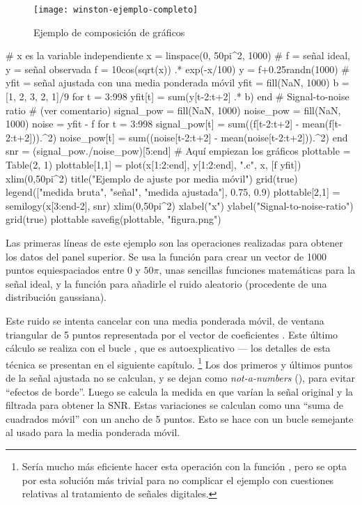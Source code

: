 \begin{figure}
\centering
\texttt{[image: winston-ejemplo-completo]}
\caption{Ejemplo de composición de gráficos}
\label{fig:winston-ejemplo-completo}
\end{figure}

\begin{juliacode}
# x es la variable independiente
x = linspace(0, 50pi^2, 1000)
# f = señal ideal, y = señal observada
f = 10cos(sqrt(x)) .* exp(-x/100)
y = f+0.25randn(1000)
# yfit = señal ajustada con una media ponderada móvil
yfit = fill(NaN, 1000)
b = [1, 2, 3, 2, 1]/9
for t = 3:998
  yfit[t] = sum(y[t-2:t+2] .* b)
end
# Signal-to-noise ratio
# (ver comentario)
signal_pow = fill(NaN, 1000)
noise_pow = fill(NaN, 1000)
noise = yfit - f
for t = 3:998
  signal_pow[t] = sum((f[t-2:t+2] - mean(f[t-2:t+2])).^2)
  noise_pow[t] = sum((noise[t-2:t+2] - mean(noise[t-2:t+2])).^2)
end
snr = (signal_pow./noise_pow)[5:end]
# Aquí empiezan los gráficos
plottable = Table(2, 1)
plottable[1,1] = plot(x[1:2:end], y[1:2:end], ".c", x, [f yfit])
xlim(0,50pi^2)
title("Ejemplo de ajuste por media móvil")
grid(true)
legend(["medida bruta", "señal", "medida ajustada"], 0.75, 0.9)
plottable[2,1] = semilogy(x[3:end-2], snr)
xlim(0,50pi^2)
xlabel("x")
ylabel("Signal-to-noise-ratio")
grid(true)
plottable
savefig(plottable, "figura.png")
\end{juliacode}

Las primeras líneas de este ejemplo son las operaciones realizadas para obtener los datos del panel superior. Se usa la función  para crear un vector de 1000 puntos equiespaciados entre $0$ y $50\pi$, unas sencillas funciones matemáticas para la señal ideal, y la función  para añadirle el ruido aleatorio (procedente de una distribución gaussiana).

Este ruido se intenta cancelar con una media ponderada móvil, de ventana triangular de 5 puntos representada por el vector de coeficientes . Este último cálculo se realiza con el bucle , que es autoexplicativo --- los detalles de esta técnica se presentan en  el siguiente capítulo.%
\footnote{%
Sería mucho más eficiente hacer esta operación con la
función , pero se opta por esta solución más trivial para no
complicar el ejemplo con cuestiones relativas al tratamiento de señales digitales.%
}
Los dos primeros y últimos puntos de la señal ajustada no se calculan, y se dejan como \emph{not-a-numbers} (), para evitar ``efectos de borde''. Luego se calcula la medida en que varían la señal original y la filtrada para obtener la SNR. Estas variaciones se calculan como una ``suma de cuadrados móvil'' con un ancho de 5 puntos. Esto se hace con un bucle semejante al usado para la media ponderada móvil.

